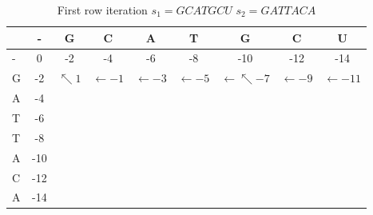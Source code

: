 \documentclass[11pt]{article}
\begin{document}
\begin{table}[ht]
	\caption{First row iteration $s_1 = GCATGCU$ $s_2 = GATTACA$}
	\label{tab:fstrow_NW}
	\centering

	\begin{tabular}{l|c ccccccc}
	\hline

	\hline
		  & - & G & C & A & T & G & C & U \\
	\hline
	 	- & 0  & -2& -4& -6& -8&-10&-12&-14\\
	 	G & -2 &$\nwarrow 1$ & $\leftarrow -1$ & $\leftarrow -3$ & $\leftarrow -5$ &  $\leftarrow \nwarrow -7$ & $\leftarrow -9$ & $\leftarrow -11$ \\

	 	A & -4 &   &   &   &   &   &   &   \\
	 	T & -6 &   &   &   &   &   &   &   \\
	 	T & -8 &   &   &   &   &   &   &   \\
	 	A & -10&   &   &   &   &   &   &   \\
	 	C & -12&   &   &   &   &   &   &   \\
	 	A & -14&   &   &   &   &   &   &   \\
	

	\hline
	\end{tabular}
\end{table}
\end{document}
